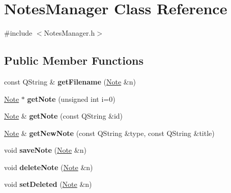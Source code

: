 \hypertarget{classNotesManager}{\section{\-Notes\-Manager \-Class \-Reference}
\label{classNotesManager}
}


{\ttfamily \#include $<$\-Notes\-Manager.\-h$>$}

\subsection*{\-Public \-Member \-Functions}
\begin{DoxyCompactItemize}
\item 
\hypertarget{classNotesManager_a73a3d9559f50711098932c8db5ee7def}{const \-Q\-String \& {\bfseries get\-Filename} (\hyperlink{classNote}{\-Note} \&n)}\label{classNotesManager_a73a3d9559f50711098932c8db5ee7def}

\item 
\hypertarget{classNotesManager_a6d33fc29d55fe78e9a11f7549d4cab88}{\hyperlink{classNote}{\-Note} $\ast$ {\bfseries get\-Note} (unsigned int i=0)}\label{classNotesManager_a6d33fc29d55fe78e9a11f7549d4cab88}

\item 
\hypertarget{classNotesManager_a9c401bfe7c91ab37a7c8c4db398e92ff}{\hyperlink{classNote}{\-Note} \& {\bfseries get\-Note} (const \-Q\-String \&id)}\label{classNotesManager_a9c401bfe7c91ab37a7c8c4db398e92ff}

\item 
\hypertarget{classNotesManager_a0c6380a0dccd8f477ad5305d7a798126}{\hyperlink{classNote}{\-Note} \& {\bfseries get\-New\-Note} (const \-Q\-String \&type, const \-Q\-String \&title)}\label{classNotesManager_a0c6380a0dccd8f477ad5305d7a798126}

\item 
\hypertarget{classNotesManager_a73b0f85ed9efe1a4e674066b25d8eca0}{void {\bfseries save\-Note} (\hyperlink{classNote}{\-Note} \&n)}\label{classNotesManager_a73b0f85ed9efe1a4e674066b25d8eca0}

\item 
\hypertarget{classNotesManager_a29d032aae2c5c2a95bbd11c8345f05e5}{void {\bfseries delete\-Note} (\hyperlink{classNote}{\-Note} \&n)}\label{classNotesManager_a29d032aae2c5c2a95bbd11c8345f05e5}

\item 
\hypertarget{classNotesManager_adf555cbe01a64c5a68a2ef9a77f4ae3d}{void {\bfseries set\-Deleted} (\hyperlink{classNote}{\-Note} \&n)}\label{classNotesManager_adf555cbe01a64c5a68a2ef9a77f4ae3d}


\end{DoxyCompactItemize}
